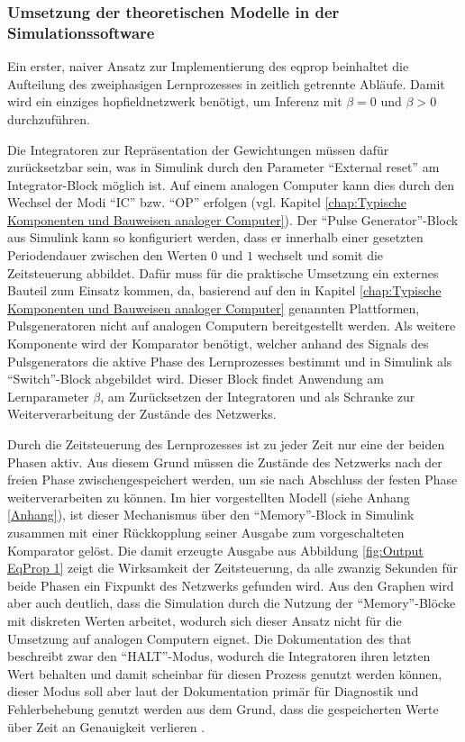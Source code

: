 \subsubsection{Umsetzung der theoretischen Modelle in der Simulationssoftware}

Ein erster, naiver Ansatz zur Implementierung des \gls{eqprop} beinhaltet die Aufteilung des zweiphasigen Lernprozesses in zeitlich getrennte Abläufe. Damit wird ein einziges \gls{hopfieldnetzwerk} benötigt, um Inferenz mit \(\beta=0\) und \(\beta>0\) durchzuführen.

Die Integratoren zur Repräsentation der Gewichtungen müssen dafür zurücksetzbar sein, was in Simulink durch den Parameter "`External reset"' am Integrator-Block möglich ist. Auf einem analogen Computer kann dies durch den Wechsel der Modi "`IC"' bzw. "`OP"' erfolgen (vgl. Kapitel \ref{chap:Typische Komponenten und Bauweisen analoger Computer}). Der "`Pulse Generator"'-Block aus Simulink kann so konfiguriert werden, dass er innerhalb einer gesetzten Periodendauer zwischen den Werten \(0\) und \(1\) wechselt und somit die Zeitsteuerung abbildet. Dafür muss für die praktische Umsetzung ein externes Bauteil zum Einsatz kommen, da, basierend auf den in Kapitel \ref{chap:Typische Komponenten und Bauweisen analoger Computer} genannten Plattformen, Pulsgeneratoren nicht auf analogen Computern bereitgestellt werden. Als weitere Komponente wird der Komparator benötigt, welcher anhand des Signals des Pulsgenerators die aktive Phase des Lernprozesses bestimmt und in Simulink als "`Switch"'-Block abgebildet wird. Dieser Block findet Anwendung am Lernparameter \(\beta\), am Zurücksetzen der Integratoren und als Schranke zur Weiterverarbeitung der Zustände des Netzwerks.

Durch die Zeitsteuerung des Lernprozesses ist zu jeder Zeit nur eine der beiden Phasen aktiv. Aus diesem Grund müssen die Zustände des Netzwerks nach der freien Phase zwischengespeichert werden, um sie nach Abschluss der festen Phase weiterverarbeiten zu können. Im hier vorgestellten Modell (siehe Anhang \ref{Anhang}), ist dieser Mechanismus über den "`Memory"'-Block in Simulink zusammen mit einer Rückkopplung seiner Ausgabe zum vorgeschalteten Komparator gelöst. Die damit erzeugte Ausgabe aus Abbildung \ref{fig:Output EqProp 1} zeigt die Wirksamkeit der Zeitsteuerung, da alle zwanzig Sekunden für beide Phasen ein Fixpunkt des Netzwerks gefunden wird. Aus den Graphen wird aber auch deutlich, dass die Simulation durch die Nutzung der "`Memory"'-Blöcke mit diskreten Werten arbeitet, wodurch sich dieser Ansatz nicht für die Umsetzung auf analogen Computern eignet. Die Dokumentation des \ac{that} beschreibt zwar den "`HALT"'-Modus, wodurch die Integratoren ihren letzten Wert behalten und damit scheinbar für diesen Prozess genutzt werden können, dieser Modus soll aber laut der Dokumentation primär für Diagnostik und Fehlerbehebung genutzt werden \ua aus dem Grund, dass die gespeicherten Werte über Zeit an Genauigkeit verlieren \cite[vgl.]{TheAnalogThingDocs}.

